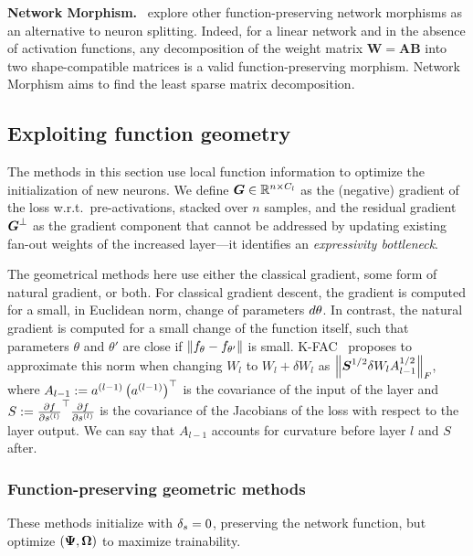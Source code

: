 \textbf{Network Morphism.}~\citet{wei_network_2016} explore other function-preserving network morphisms as an alternative to neuron splitting. Indeed, for a linear network and in the absence of activation functions, any decomposition of the weight matrix $\boldsymbol{W} = \boldsymbol{A}\boldsymbol{B}$ into two shape-compatible matrices is a valid function-preserving morphism. Network Morphism aims to find the least sparse matrix decomposition.

\subsection{Exploiting function geometry}
\label{sec:function_geometry}

The methods in this section use local function information to optimize the initialization of new neurons. We define $\Gradpreact \in \mathbb{R}^{n \times \cp}$ as the (negative) gradient of the loss w.r.t.\ pre-activations, stacked over $n$ samples, and the residual gradient $\Bottleneck$ as the gradient component that cannot be addressed by updating existing fan-out weights of the increased layer---it identifies an \emph{expressivity bottleneck}.

The geometrical methods here use either the classical gradient, some form of natural gradient, or both. For classical gradient descent, the gradient is computed for a small, in Euclidean norm, change of parameters $\dtheta$. In contrast, the natural gradient is computed for a small change of the function itself, such that parameters $\theta$ and $\theta'$ are close if $\norm{f_{\theta} - f_{\theta'}}$ is small.  
K-FAC~\citep{dangelKroneckerfactoredApproximateCurvature2025} proposes to approximate this norm when changing $W_l$ to $W_l+\delta W_l$ as $\frob{\sqrtS \delta W_l \sqrtA_{l-1}}$, 
where $A_{l-1} := \postact[l-1] \transp{\postact[l-1]}$ is the covariance of the input of the layer
and $S:= \trans{\frac{\partial f}{\partial \preact[l]}} \frac{\partial f}{\partial \preact[l]}$ is the covariance of the Jacobians of the loss with respect to the layer output.
We can say that $A_{l-1}$ accounts for curvature before layer $l$ and $S$ after.

\subsubsection{Function-preserving geometric methods}

These methods initialize with $\deltas = 0$, preserving the network function, but optimize $(\Fanin, \Fanout)$ to maximize trainability.

